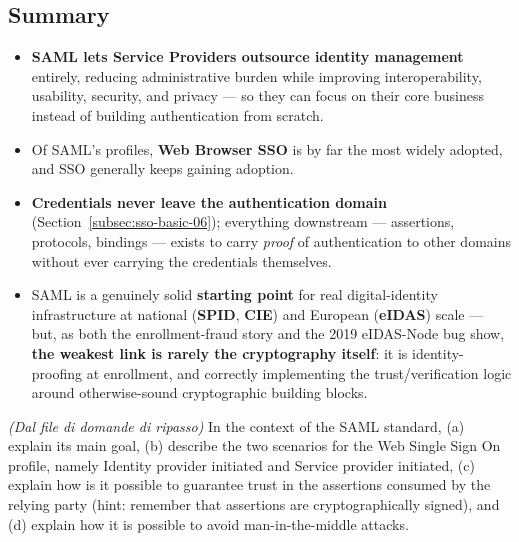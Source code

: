 \documentclass[12pt, a4paper]{article}
\newcounter{esercizio}[section]
\begin{document}
\subsection{Summary}
\begin{itemize}
    \item \textbf{SAML lets Service Providers outsource identity management} entirely, reducing administrative burden while improving interoperability, usability, security, and privacy --- so they can focus on their core business instead of building authentication from scratch.
    \item Of SAML's profiles, \textbf{Web Browser SSO} is by far the most widely adopted, and SSO generally keeps gaining adoption.
    \item \textbf{Credentials never leave the authentication domain} (Section~\ref{subsec:sso-basic-06}); everything downstream --- assertions, protocols, bindings --- exists to carry \emph{proof} of authentication to other domains without ever carrying the credentials themselves.
    \item SAML is a genuinely solid \textbf{starting point} for real digital-identity infrastructure at national (\textbf{SPID}, \textbf{CIE}) and European (\textbf{eIDAS}) scale --- but, as both the enrollment-fraud story and the 2019 eIDAS-Node bug show, \textbf{the weakest link is rarely the cryptography itself}: it is identity-proofing at enrollment, and correctly implementing the trust/verification logic around otherwise-sound cryptographic building blocks.
\end{itemize}

\begin{tcolorbox}[colback=lightergray!10, colframe=tocsec, title=\textbf{Esercizio \theesercizio}]
\textit{(Dal file di domande di ripasso)} In the context of the SAML standard, (a) explain its main goal, (b) describe the two scenarios for the Web Single Sign On profile, namely Identity provider initiated and Service provider initiated, (c) explain how is it possible to guarantee trust in the assertions consumed by the relying party (hint: remember that assertions are cryptographically signed), and (d) explain how it is possible to avoid man-in-the-middle attacks.
\end{tcolorbox}
\end{document}
